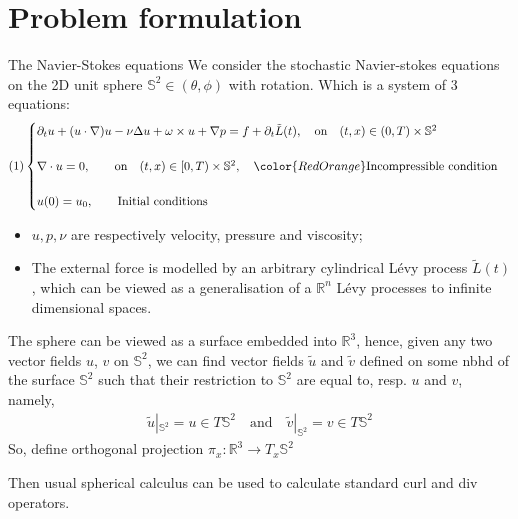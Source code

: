 \documentclass[xcolor=dvipsnames,leqno]{beamer}
\newcommand{\R}{\mathbb{R}}
\begin{document}
\section{Problem formulation}
\begin{frame}[shrink]{The Navier-Stokes equations}
 We consider the stochastic Navier-stokes equations on the 2D unit sphere $\mathbb{S}^2\in (\theta,\phi)$ with rotation. Which is a system of 3 equations:
	\begin{align*}(1)
		\begin{cases}
			\partial_t u+ (u\cdot\nabla)u-\nu\Delta u+\omega\times u+\nabla p=f+\partial_t \tilde{L}(t),\quad\text{on} \quad (t, x)\in (0, T)\times\mathbb{S}^2\\
			&\\
			\nabla\cdot u=0,\qquad\text{on} \quad (t, x)\in[0, T)\times\mathbb{S}^2, \quad{\color{RedOrange}\text{Incompressible condition}}\\
			&\\
			u(0)=u_0, \qquad\text{Initial conditions}	
		\end{cases}	
	\end{align*}  
\begin{itemize}
	\item $u, p, \nu$ are respectively velocity, pressure and viscosity;

	\item The external force is modelled by an arbitrary cylindrical L\'evy process $\tilde{L}(t)$, which can be viewed as a generalisation of a  $\mathbb{R}^n$ L\'evy processes to infinite dimensional spaces.%
\end{itemize}
\end{frame}
\begin{frame}
	The sphere can be viewed as a surface embedded into $\R^3$, hence, given any two vector fields $u$, $v$ on $\mathbb{S}^2$, we can find vector fields $\tilde{u}$ and $\tilde{v}$ defined on some nbhd of the surface $\mathbb{S}^2$ such that their restriction to $\mathbb{S}^2$ are equal to, resp. $u$ and $v$, namely,
	\begin{align*}
		\tilde{u}|_{\mathbb{S}^2}=u\in T\mathbb{S}^2\quad\text{and}\quad\tilde{v}|_{\mathbb{S}^2}=v\in T\mathbb{S}^2 
	\end{align*}
So, define orthogonal projection $\pi_x:\R^3\to T_x \mathbb{S}^2$

Then usual spherical calculus can be used to calculate standard curl and div operators.
\end{frame}
\end{document}
